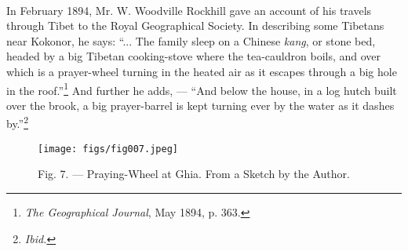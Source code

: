 \documentclass[a4paper, 11pt, oneside, polutonikogreek, english]{article}
\begin{document}
\paragraph{}
In February 1894, Mr. W. Woodville Rockhill gave an account of his travels through Tibet to the Royal Geographical Society. In describing some Tibetans near Kokonor, he says: ``... The family sleep on a Chinese \emph{kang}, or stone bed, headed by a big Tibetan cooking-stove where the tea-cauldron boils, and over which is a prayer-wheel turning in the heated air as it escapes through a big hole in the roof.''\footnote{\emph{The Geographical Journal}, May 1894, p. 363.} And further he adds, --- ``And below the house, in a log hutch built over the brook, a big prayer-barrel is kept turning ever by the water as it dashes by.''\footnote{\emph{Ibid.}}

\begin{figure}[H]
\centering
\texttt{[image: figs/fig007.jpeg]}
\caption{Fig. 7. --- Praying-Wheel at Ghia. From a Sketch by the Author.}
\end{figure}
\end{document}
